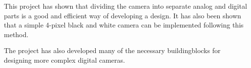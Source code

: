 This project has shown that dividing the camera into separate analog and digital parts is a good and efficient way of developing a design.
It has also been shown that a simple 4-pixel black and white camera can be implemented following this method.

The project has also developed many of the necessary buildingblocks for designing more complex digital cameras.